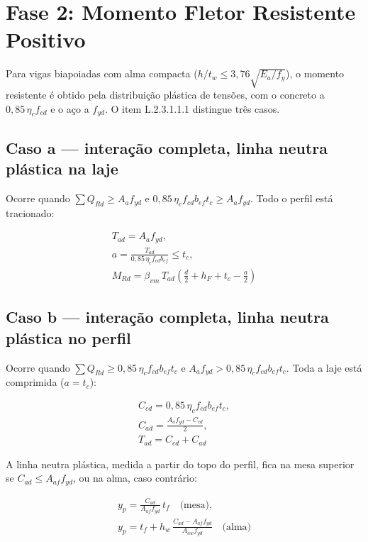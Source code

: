 \section{Fase 2: Momento Fletor Resistente Positivo}\label{sec:2.6}
Para vigas biapoiadas com alma compacta ($h/t_w \le 3{,}76\sqrt{E_a/f_y}$), o momento resistente é obtido pela distribuição plástica de tensões, com o concreto a $0{,}85\,\eta_c f_{cd}$ e o aço a $f_{yd}$. O item L.2.3.1.1.1 distingue três casos.

\subsection{Caso a --- interação completa, linha neutra plástica na laje}
Ocorre quando $\sum Q_{Rd} \ge A_a f_{yd}$ e $0{,}85\,\eta_c f_{cd} b_{ef} t_c \ge A_a f_{yd}$. Todo o perfil está tracionado:

\begin{gather*}
  T_{ad} = A_a f_{yd}, \\
  a = \frac{T_{ad}}{0{,}85\,\eta_c f_{cd} b_{ef}} \le t_c, \\
  M_{Rd} = \beta_{vm}\, T_{ad}\left(\frac{d}{2} + h_F + t_c - \frac{a}{2}\right)
\end{gather*}

\subsection{Caso b --- interação completa, linha neutra plástica no perfil}
Ocorre quando $\sum Q_{Rd} \ge 0{,}85\,\eta_c f_{cd} b_{ef} t_c$ e $A_a f_{yd} > 0{,}85\,\eta_c f_{cd} b_{ef} t_c$. Toda a laje está comprimida ($a = t_c$):

\begin{gather*}
  C_{cd} = 0{,}85\,\eta_c f_{cd} b_{ef} t_c, \\
  C_{ad} = \frac{A_a f_{yd} - C_{cd}}{2}, \\
  T_{ad} = C_{cd} + C_{ad}
\end{gather*}

A linha neutra plástica, medida a partir do topo do perfil, fica na mesa superior se $C_{ad} \le A_{af} f_{yd}$, ou na alma, caso contrário:

\begin{gather*}
  y_p = \frac{C_{ad}}{A_{af} f_{yd}}\, t_f \quad \text{(mesa)}, \\
  y_p = t_f + h_w\,\frac{C_{ad} - A_{af} f_{yd}}{A_{aw} f_{yd}} \quad \text{(alma)}
\end{gather*}

